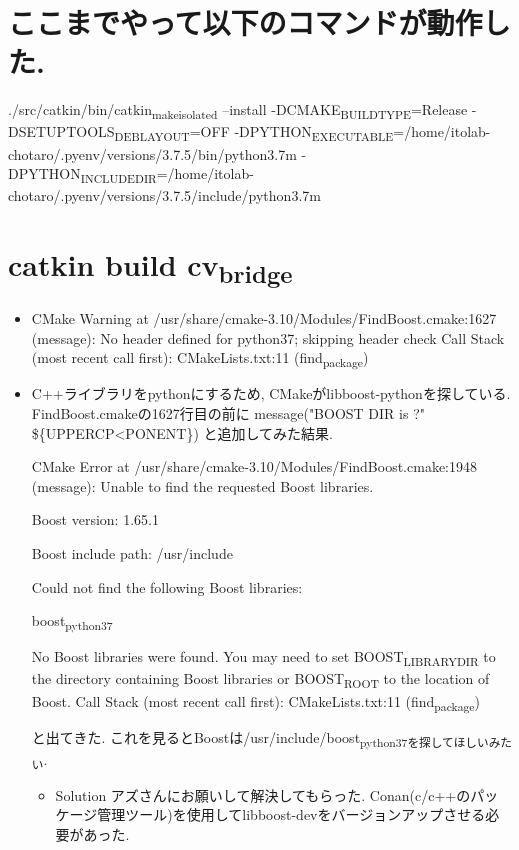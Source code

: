 \documentclass[11pt]{article}
\begin{document}
\section{ここまでやって以下のコマンドが動作した.}
\label{sec:org136da26}
./src/catkin/bin/catkin\textsubscript{make}\textsubscript{isolated} --install -DCMAKE\textsubscript{BUILD}\textsubscript{TYPE}=Release -DSETUPTOOLS\textsubscript{DEB}\textsubscript{LAYOUT}=OFF -DPYTHON\textsubscript{EXECUTABLE}=/home/itolab-chotaro/.pyenv/versions/3.7.5/bin/python3.7m -DPYTHON\textsubscript{INCLUDE}\textsubscript{DIR}=/home/itolab-chotaro/.pyenv/versions/3.7.5/include/python3.7m


\section{catkin build cv\textsubscript{bridge}}
\label{sec:org19c893f}
\begin{itemize}
\item CMake Warning at /usr/share/cmake-3.10/Modules/FindBoost.cmake:1627 (message):
No header defined for python37; skipping header check
Call Stack (most recent call first):
  CMakeLists.txt:11 (find\textsubscript{package})

\item C++ライブラリをpythonにするため, CMakeがlibboost-pythonを探している.
FindBoost.cmakeの1627行目の前に
message("BOOST DIR is ?" \$\{UPPERCP<PONENT\}) と追加してみた結果.

CMake Error at /usr/share/cmake-3.10/Modules/FindBoost.cmake:1948 (message):
Unable to find the requested Boost libraries.

Boost version: 1.65.1

Boost include path: /usr/include

Could not find the following Boost libraries:

boost\textsubscript{python37}

No Boost libraries were found.  You may need to set BOOST\textsubscript{LIBRARYDIR} to the
directory containing Boost libraries or BOOST\textsubscript{ROOT} to the location of
Boost.
Call Stack (most recent call first):
CMakeLists.txt:11 (find\textsubscript{package})

と出てきた.
これを見るとBoostは/usr/include/boost\textsubscript{python37を探してほしいみたい}.

\begin{itemize}
\item Solution
アズさんにお願いして解決してもらった.
Conan(c/c++のパッケージ管理ツール)を使用してlibboost-devをバージョンアップさせる必要があった.
\end{itemize}
\end{itemize}
\end{document}

